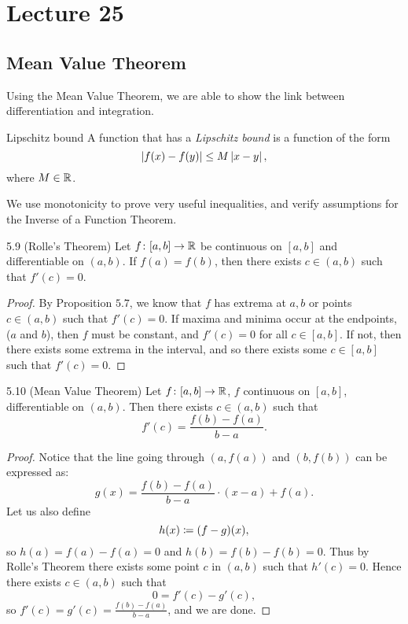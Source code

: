 \documentclass[class=article, crop=false]{standalone}
\begin{document}
  \section{Lecture 25}
  \subsection{Mean Value Theorem}
  Using the Mean Value Theorem, we are able to show the link between differentiation and integration.\begin{definition}{Lipschitz bound}
    A function that has a \emph{Lipschitz bound} is a function of the form
    \[
      \left\lvert f(x) - f(y) \right\rvert\leq M\left\lvert x - y \right\rvert,
    \]
    where $M\in\mathbb{R}$.
  \end{definition}
  We use monotonicity to prove very useful inequalities, and verify assumptions for the Inverse of a Function Theorem.
  \begin{theorem}{5.9 (Rolle's Theorem)}
    Let $f\colon [a, b]\to \mathbb{R}$ be continuous on $[a, b]$ and differentiable on $(a, b)$. If $f(a) = f(b)$, then there exists $c\in (a, b)$ such that $f'(c) = 0$.
    \begin{proof}
      By Proposition $5.7$, we know that $f$ has extrema at $a, b$ or points $c\in (a, b)$ such that $f'(c) = 0$. If maxima and minima occur at the endpoints, ($a$ and $b$), then $f$ must be constant, and $f'(c) = 0$ for all $c\in [a, b]$. If not, then there exists some extrema in the interval, and so there exists some $c\in [a, b]$ such that $f'(c) = 0$.
    \end{proof}
  \end{theorem}
  \begin{theorem}{5.10 (Mean Value Theorem)}
    Let $f\colon [a, b]\to \mathbb{R}$, $f$ continuous on $[a, b]$, differentiable on $(a, b)$. Then there exists $c\in (a, b)$ such that
    \[
      f'(c) = \frac{f(b) - f(a)}{b - a}.
    \]
    \begin{proof}
      Notice that the line going through $(a, f(a))$ and $(b, f(b))$ can be expressed as:
      \[
        g(x) = \frac{f(b) - f(a)}{b - a}\cdot (x - a) + f(a).
      \]
      Let us also define
      \[
        h(x)\coloneqq (f - g)(x),
      \]
      so $h(a) = f(a) - f(a) = 0$ and $h(b) = f(b) - f(b) = 0$. Thus by Rolle's Theorem there exists some point $c$ in $(a, b)$ such that $h'(c) = 0$. Hence there exists $c\in (a, b)$ such that
      \[
        0 = f'(c) - g'(c),
      \]
      so $\displaystyle f'(c) = g'(c) = \frac{f(b) - f(a)}{b - a}$, and we are done.
    \end{proof}
  \end{theorem}
\end{document}
